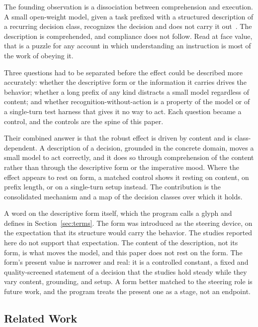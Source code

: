 \documentclass[11pt,a4paper]{article}
\begin{document}
The founding observation is a dissociation between comprehension and execution. A small
open-weight model, given a task prefixed with a structured description of a recurring
decision class, recognizes the decision and does not carry it out~\citep{neilson2026q2}.
The description is comprehended, and compliance does not follow. Read at face value,
that is a puzzle for any account in which understanding an instruction is most of the
work of obeying it.

Three questions had to be separated before the effect could be described more
accurately: whether the descriptive form or the information it carries drives the
behavior; whether a long prefix of any kind distracts a small model regardless of
content; and whether recognition-without-action is a property of the model or of a
single-turn test harness that gives it no way to act. Each question became a control,
and the controls are the spine of this paper.

Their combined answer is that the robust effect is driven by content and is
class-dependent. A description of a decision, grounded in the concrete domain, moves a
small model to act correctly, and it does so through comprehension of the content
rather than through the descriptive form or the imperative mood. Where the effect
appears to rest on form, a matched control shows it resting on content, on prefix
length, or on a single-turn setup instead. The contribution is the consolidated
mechanism and a map of the decision classes over which it holds.

A word on the descriptive form itself, which the program calls a glyph and defines in
Section~\ref{sec:terms}. The form was introduced as the steering device, on the
expectation that its structure would carry the behavior. The studies reported here do
not support that expectation. The content of the description, not its form, is what
moves the model, and this paper does not rest on the form. The form's present value is
narrower and real: it is a controlled constant, a fixed and quality-screened statement
of a decision that the studies hold steady while they vary content, grounding, and
setup. A form better matched to the steering role is future work, and the program
treats the present one as a stage, not an endpoint.

\subsection{Related Work}
\end{document}
